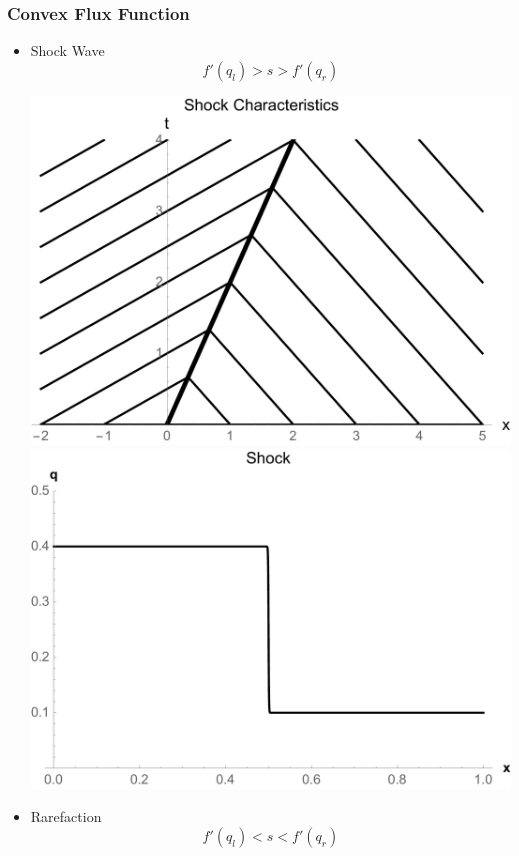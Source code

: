 \documentclass[10pt]{beamer}
\begin{document}
    \begin{frame}
      \frametitle{Convex Flux Function}
      \begin{itemize}
        \item Shock Wave
          \[
            f'(q_l) > s > f'(q_r)
          \]
          \begin{center}
            \includegraphics[scale=0.13]{Figures/ShockCharacteristics.pdf}
            \includegraphics[scale=0.13]{Figures/CompressiveShock.pdf}
          \end{center}
        \item Rarefaction
          \[
            f'(q_l) < s < f'(q_r)
          \]
          \begin{center}

\end{center}
\end{itemize}
\end{frame}
\end{document}
